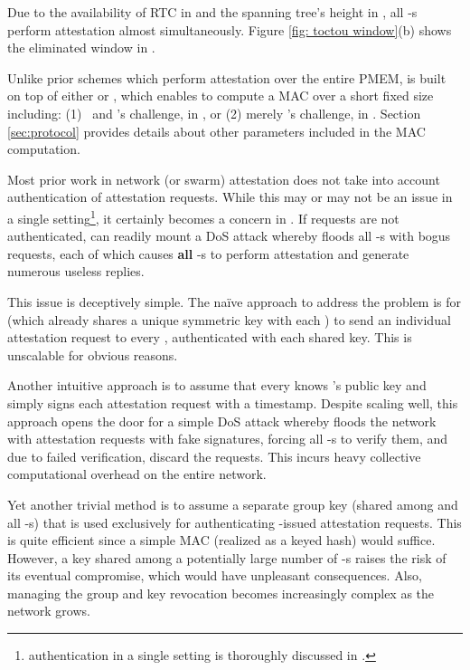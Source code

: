 Due to the availability of RTC in \trapsrtc and the spanning tree's height in \trapsnortc, 
all \prv-s perform attestation almost simultaneously. Figure \ref{fig: toctou window}(b) 
shows the eliminated \toctou window in \trapsrtc.

Unlike prior \sa schemes which perform attestation over the 
entire PMEM, \system is built on top of either \rata or \casu, which enables \prv to 
compute a MAC over a short fixed size including:
(1) \lmt\ and \vrf's challenge, in \rata,  or (2) merely \vrf's challenge, in \casu.
Section \ref{sec:protocol} provides details about other parameters included in the MAC computation.

Most prior work in network (or swarm) attestation
does not take into account authentication of attestation requests. While this may or may
not be an issue in a single \prv{} \ra setting\footnote{\vrf authentication in a single \prv 
setting is thoroughly discussed in \cite{Brasser-DAC16}.}, it certainly becomes a concern in \sa.
If requests are not authenticated, \sadv can readily mount a DoS attack whereby \sadv floods all 
\prv-s with bogus requests, each of which causes {\bf all} \prv-s to perform attestation and 
generate numerous useless replies.

This issue is deceptively simple. The na\"ive approach to address the problem is for \vrf
(which already shares a unique symmetric key with each \prv) to send 
an individual attestation request to every \prv, authenticated with each shared key.
This is unscalable for obvious reasons. 

Another intuitive approach is to assume that every \prv knows \vrf's
public key and \vrf simply signs each attestation request with a timestamp. Despite scaling well, this 
approach opens the door for a simple DoS attack whereby \sadv floods the network with 
attestation requests with fake signatures, forcing all \prv-s to verify them, and due to failed
verification, discard the requests. This incurs heavy collective computational 
overhead on the entire network.

Yet another trivial method is to assume a separate group key (shared among \vrf and all \prv-s) that is
used exclusively for authenticating \vrf-issued attestation requests. This is quite efficient
since a simple MAC (realized as a keyed hash) would suffice. However, a key shared among a potentially
large number of \prv-s raises the risk of its eventual compromise, which would have 
unpleasant consequences. 
Also, managing the group and key revocation becomes increasingly complex as the network grows.

